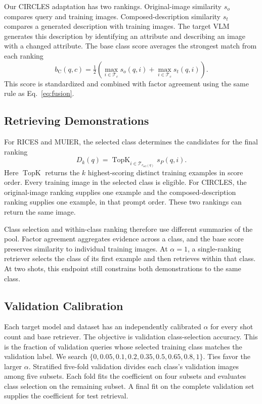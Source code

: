\documentclass[10pt,twocolumn,letterpaper]{article}
\newcommand{\train}{\mathcal{T}}
\newcommand{\TopK}{\operatorname{TopK}}
\begin{document}
Our CIRCLES adaptation has two rankings. Original-image similarity $s_o$ compares query and training images. Composed-description similarity $s_t$ compares a generated description with training images. The target VLM generates this description by identifying an attribute and describing an image with a changed attribute. The base class score averages the strongest match from each ranking
\begin{equation}
 b_{\mathrm{C}}(q,c)=\tfrac{1}{2}\left(\max_{i\in\train_c}s_o(q,i)
 +\max_{i\in\train_c}s_t(q,i)\right).
 \label{eq:circles}
\end{equation}
This score is standardized and combined with factor agreement using the same rule as Eq.~\ref{eq:fusion}.

\subsection{Retrieving Demonstrations}
\label{sec:selection}
For RICES and MUIER, the selected class determines the candidates for the final ranking
\begin{equation}
 D_k(q)=\TopK_{i\in\train_{c_{\mathrm{sel}}(q)}}s_P(q,i).
 \label{eq:retrieval}
\end{equation}
Here $\TopK$ returns the $k$ highest-scoring distinct training examples in score order. Every training image in the selected class is eligible. For CIRCLES, the original-image ranking supplies one example and the composed-description ranking supplies one example, in that prompt order. These two rankings can return the same image.

Class selection and within-class ranking therefore use different summaries of the pool. Factor agreement aggregates evidence across a class, and the base score preserves similarity to individual training images. At $\alpha=1$, a single-ranking retriever selects the class of its first example and then retrieves within that class. At two shots, this endpoint still constrains both demonstrations to the same class.

\subsection{Validation Calibration}
\label{sec:calibration}
Each target model and dataset has an independently calibrated $\alpha$ for every shot count and base retriever. The objective is validation class-selection accuracy. This is the fraction of validation queries whose selected training class matches the validation label. We search $\{0,0.05,0.1,0.2,0.35,0.5,0.65,0.8,1\}$. Ties favor the larger $\alpha$. Stratified five-fold validation divides each class's validation images among five subsets. Each fold fits the coefficient on four subsets and evaluates class selection on the remaining subset. A final fit on the complete validation set supplies the coefficient for test retrieval.
\end{document}

